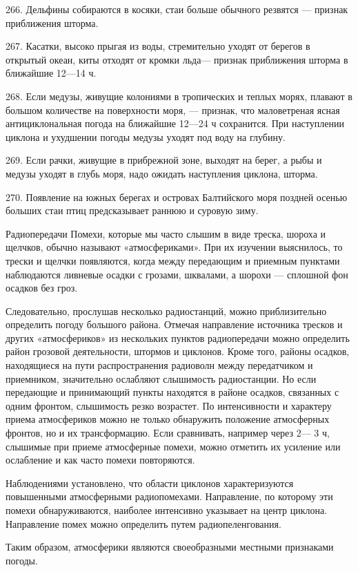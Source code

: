 266. Дельфины собираются в косяки, стаи больше обычного резвятся — признак приближения шторма.

267. Касатки, высоко прыгая из воды, стремительно уходят от берегов в открытый океан, киты отходят от кромки льда— признак приближения шторма в ближайшие 12—14 ч.

268. Если медузы, живущие колониями в тропических и теплых морях, плавают в большом количестве на поверхности моря, — признак, что маловетреная ясная антициклональная погода на ближайшие 12—24 ч сохранится. При наступлении циклона и ухудшении погоды медузы уходят под воду на глубину.

269. Если рачки, живущие в прибрежной зоне, выходят на берег, а рыбы и медузы уходят в глубь моря, надо ожидать наступления циклона, шторма.

270. Появление на южных берегах и островах Балтийского моря поздней осенью больших стаи птиц предсказывает раннюю и суровую зиму.

Радиопередачи
Помехи, которые мы часто слышим в виде треска, шороха и щелчков, обычно называют «атмосфериками». При их изучении выяснилось, то трески и щелчки появляются, когда между передающим и приемным пунктами наблюдаются ливневые осадки с грозами, шквалами, а шорохи --- сплошной фон осадков без гроз.

Следовательно, прослушав несколько радиостанций, можно приблизительно определить погоду большого района. Отмечая направление источника тресков и других «атмосфериков» из нескольких пунктов радиопередачи можно определить район грозовой деятельности, штормов и циклонов. Кроме того, районы осадков, находящиеся на пути распространения радиоволн между передатчиком и приемником, значительно ослабляют слышимость радиостанции. Но если передающие и принимающий пункты находятся в районе осадков, связанных с одним фронтом, слышимость резко возрастет. По интенсивности и характеру приема атмосфериков можно не только обнаружить положение атмосферных фронтов, но и их трансформацию. Если сравнивать, например через 2— 3 ч, слышимые при приеме атмосферные помехи, можно отметить их усиление или ослабление и как часто помехи повторяются.

Наблюдениями установлено, что области циклонов характеризуются повышенными атмосферными радиопомехами. Направление, по которому эти помехи обнаруживаются, наиболее интенсивно указывает на центр циклона. Направление помех можно определить путем радиопеленгования.

Таким образом, атмосферики являются своеобразными местными признаками погоды.

